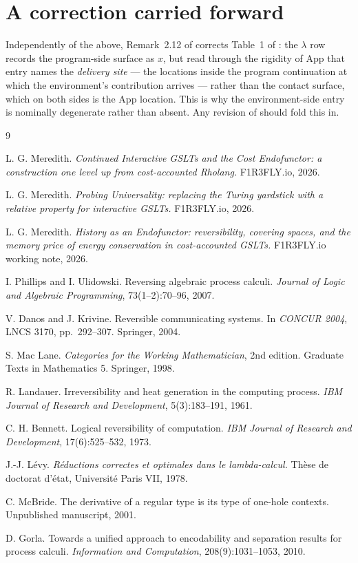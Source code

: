 \documentclass[11pt,a4paper]{article}
\theoremstyle{definition}
\theoremstyle{plain}
\theoremstyle{remark}
\begin{document}
\section*{A correction carried forward}

Independently of the above, Remark~2.12 of \cite{probe} corrects Table~1 of \cite{cost}: the
$\lambda$ row records the program-side surface as $x$, but read through the rigidity of
$\mathrm{App}$ that entry names the \emph{delivery site} --- the locations inside the program
continuation at which the environment's contribution arrives --- rather than the contact surface,
which on both sides is the $\mathrm{App}$ location. This is why the environment-side entry is
nominally degenerate rather than absent. Any revision of \cite{cost} should fold this in.

\begin{thebibliography}{9}

L. G. Meredith.
\emph{Continued Interactive GSLTs and the Cost Endofunctor: a construction one level up from
cost-accounted Rholang.}
F1R3FLY.io, 2026.

L. G. Meredith.
\emph{Probing Universality: replacing the Turing yardstick with a relative property for interactive
GSLTs.}
F1R3FLY.io, 2026.

L. G. Meredith.
\emph{History as an Endofunctor: reversibility, covering spaces, and the memory price of energy
conservation in cost-accounted GSLTs.}
F1R3FLY.io working note, 2026.

I. Phillips and I. Ulidowski.
Reversing algebraic process calculi.
\emph{Journal of Logic and Algebraic Programming}, 73(1--2):70--96, 2007.

V. Danos and J. Krivine.
Reversible communicating systems.
In \emph{CONCUR 2004}, LNCS 3170, pp.~292--307. Springer, 2004.

S. Mac Lane.
\emph{Categories for the Working Mathematician}, 2nd edition.
Graduate Texts in Mathematics 5. Springer, 1998.

R. Landauer.
Irreversibility and heat generation in the computing process.
\emph{IBM Journal of Research and Development}, 5(3):183--191, 1961.

C. H. Bennett.
Logical reversibility of computation.
\emph{IBM Journal of Research and Development}, 17(6):525--532, 1973.

J.-J. Lévy.
\emph{Réductions correctes et optimales dans le lambda-calcul.}
Thèse de doctorat d'état, Université Paris VII, 1978.

C. McBride.
The derivative of a regular type is its type of one-hole contexts.
Unpublished manuscript, 2001.

D. Gorla.
Towards a unified approach to encodability and separation results for process calculi.
\emph{Information and Computation}, 208(9):1031--1053, 2010.

\end{thebibliography}
\end{document}
